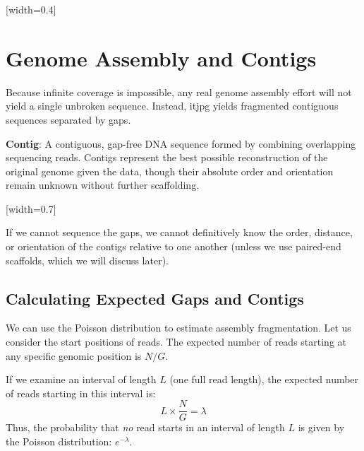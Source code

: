 [width=0.4\textwidth]

\section{Genome Assembly and Contigs}

Because infinite coverage is impossible, any real genome assembly effort will not yield a single unbroken sequence. Instead, itjpg yields fragmented contiguous sequences separated by gaps.

\begin{important}
    \textbf{Contig}: A contiguous, gap-free DNA sequence formed by combining overlapping sequencing reads. Contigs represent the best possible reconstruction of the original genome given the data, though their absolute order and orientation remain unknown without further scaffolding.
\end{important}


[width=0.7\textwidth]

If we cannot sequence the gaps, we cannot definitively know the order, distance, or orientation of the contigs relative to one another (unless we use paired-end scaffolds, which we will discuss later).

\subsection{Calculating Expected Gaps and Contigs}
We can use the Poisson distribution to estimate assembly fragmentation. Let us consider the start positions of reads. The expected number of reads starting at any specific genomic position is $N/G$.

If we examine an interval of length $L$ (one full read length), the expected number of reads starting in this interval is:
\[ L \times \frac{N}{G} = \lambda \]
Thus, the probability that \textit{no} read starts in an interval of length $L$ is given by the Poisson distribution: $e^{-\lambda}$.

